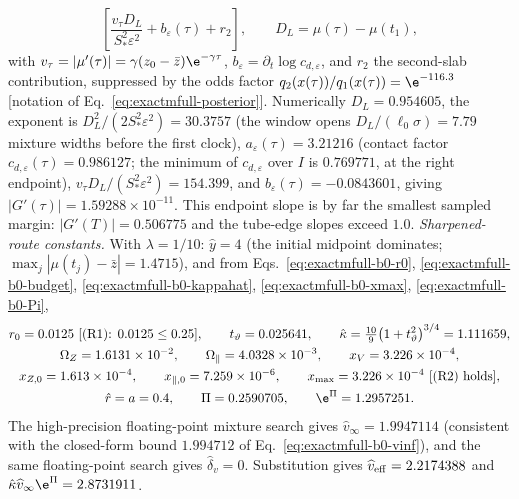 \begin{remark}
\begin{equation}
  \left[\frac{v_\tau D_L}{S_*^2\varepsilon^2}
        +b_\varepsilon(\tau)+r_2\right],
 \qquad D_L=\mu(\tau)-\mu(t_1),
 \label{eq:exactmfull-b0-endpoint-slope}
\end{equation}
with \(v_\tau=|\mu'(\tau)|=\gamma(z_0-\bar z)\e^{-\gamma\tau}\),
\(b_\varepsilon=\partial_t\log c_{d,\varepsilon}\), and \(r_2\) the
second-slab contribution, suppressed by the odds factor
\(q_2(x(\tau))/q_1(x(\tau))=\e^{-116.3}\)
[notation of Eq.~\eqref{eq:exactmfull-posterior}].
Numerically \(D_L=0.954605\), the exponent is
\(D_L^2/(2S_*^2\varepsilon^2)=30.3757\) (the window opens
\(D_L/(\ell_0\sigma)=7.79\) mixture widths before the first clock),
\(a_\varepsilon(\tau)=3.21216\) (contact factor
\(c_{d,\varepsilon}(\tau)=0.986127\); the minimum of
\(c_{d,\varepsilon}\) over \(I\) is \(0.769771\), at the right endpoint),
\(v_\tau D_L/(S_*^2\varepsilon^2)=154.399\), and
\(b_\varepsilon(\tau)=-0.0843601\), giving
\(|G'(\tau)|=1.59288\times10^{-11}\).  This endpoint slope is by far the
smallest sampled margin: \(|G'(T)|=0.506775\) and the tube-edge slopes exceed
\(1.0\).
\emph{Sharpened-route constants.}  With \(\lambda=1/10\):
\(\hat y=4\) (the initial midpoint dominates;
\(\max_j|\mu(t_j)-\bar z|=1.4715\)), and from
Eqs.~\eqref{eq:exactmfull-b0-r0}, \eqref{eq:exactmfull-b0-budget},
\eqref{eq:exactmfull-b0-kappahat}, \eqref{eq:exactmfull-b0-xmax},
\eqref{eq:exactmfull-b0-Pi},
\begin{equation}
 \begin{gathered}
 r_0=0.0125\ \text{[(R1): }0.0125\le0.25\text{]},
 \qquad
 t_\vartheta=0.025641,
 \qquad
 \hat\kappa=\tfrac{10}{9}\bigl(1+t_\vartheta^2\bigr)^{3/4}=1.111659,\\
 \Omega_Z=1.6131\times10^{-2},
 \qquad
 \Omega_\parallel=4.0328\times10^{-3},
 \qquad
 x_V=3.226\times10^{-4},\\
 x_{Z,0}=1.613\times10^{-4},
 \qquad
 x_{\parallel,0}=7.259\times10^{-6},
 \qquad
 x_{\max}=3.226\times10^{-4}\ \text{[(R2) holds]},\\
 \hat r=a=0.4,
 \qquad
 \Pi=0.2590705,
 \qquad
 \e^{\Pi}=1.2957251.
 \end{gathered}
 \label{eq:exactmfull-b0-anchor-constants}
\end{equation}
The high-precision floating-point mixture search gives
\(\widehat v_\infty=1.9947114\)
(consistent with the closed-form bound \(1.994712\) of
Eq.~\eqref{eq:exactmfull-b0-vinf}), and the same floating-point search gives
\(\widehat\delta_v=0\).  Substitution gives
\(\widehat v_{\rm eff}=2.2174388\) and
\(\hat\kappa\widehat v_\infty\e^{\Pi}=2.8731911\).

\end{remark}
